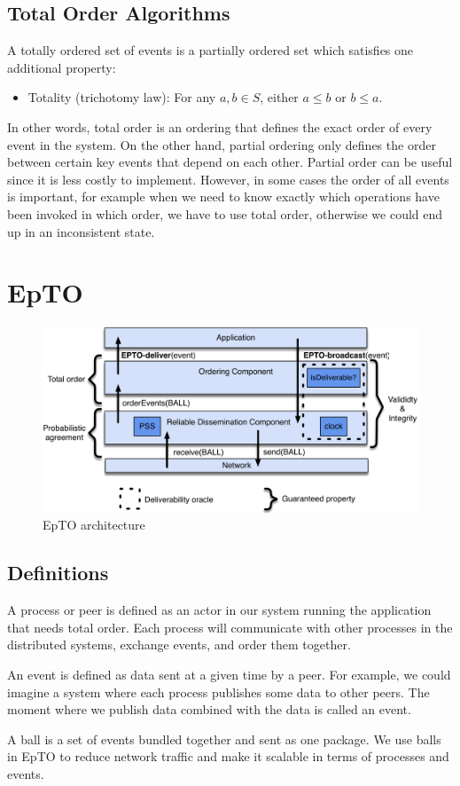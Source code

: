 \documentclass[10pt,conference,a4paper]{IEEEtran}
\begin{document}
\subsection{Total Order Algorithms}
A totally ordered set of events is a partially ordered set which satisfies one additional property:
\begin{itemize}
	\item Totality (trichotomy law): For any $a, b \in S$, either $a \leq b$  or $b \leq a$.
\end{itemize}
\par
In other words, total order is an ordering that defines the exact order of every event in the system. On the other hand, partial ordering only defines the order between certain key events that depend on each other. Partial order can be useful since it is less costly to implement. However, in some cases the order of all events is important, for example when we need to know exactly which operations have been invoked in which order, we have to use total order, otherwise we could end up in an inconsistent state.

\section{EpTO}
\begin{figure}
	\includegraphics[width=\linewidth]{figures/architecture.pdf}
	\caption{EpTO architecture \autocite{matos2015epto}}
	\label{fig:epto-architecture}
\end{figure}
\subsection{Definitions}
A process or peer is defined as an actor in our system running the application that needs total order. Each process will communicate with other processes in the distributed systems, exchange events, and order them together.
\par
An event is defined as data sent at a given time by a peer. For example, we could imagine a system where each process publishes some data to other peers. The moment where we publish data combined with the data is called an event.
\par
A ball is a set of events bundled together and sent as one package. We use balls in EpTO to reduce network traffic and make it scalable in terms of processes and events.
\end{document}

